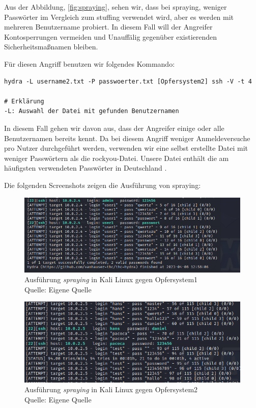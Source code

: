 Aus der Abbildung, \ref{fig:spraying}, sehen wir, dass bei \gls{spraying}, weniger Passwörter im Vergleich zum \gls{stuffing} verwendet wird, aber es werden mit mehreren Benutzername probiert. In diesem Fall will der Angreifer  Kontosperrungen vermeiden und Unauffälig gegenüber existierenden Sicherheitsmaßnamen bleiben.

Für diesen Angriff benutzen wir folgendes Kommando:
{
\begin{Verbatim}[frame=single]
hydra -L username2.txt -P passwoerter.txt [Opfersystem2] ssh -V -t 4

# Erklärung
-L: Auswahl der Datei mit gefunden Benutzernamen
\end{Verbatim}
}

\newpage
In diesem Fall gehen wir davon aus, dass der Angreifer einige oder alle Benutzernamen bereits kennt. Da bei diesem Angriff weniger Anmeldeversuche pro Nutzer durchgeführt werden, verwenden wir eine selbst erstellte Datei mit weniger Passwörtern als die \gls{rockyou}-Datei. Unsere Datei enthält die am häufigsten verwendeten Passwörter in Deutschland \citep{silicon_passwort}.

Die folgenden Screenshots zeigen die Ausführung von \gls{spraying}:
\begin{figure}[H]
   \centering
   \includegraphics[width=1\textwidth]{assets/Spraying_Kali.png}
   \caption[Ausführung \textit{\gls{spraying}} in Kali Linux gegen Opfersystem1]
   {Ausführung \textit{\gls{spraying}} in Kali Linux gegen Opfersystem1\\Quelle: Eigene Quelle}
   \centering
\end{figure}

\begin{figure}[H]
   \centering
   \includegraphics[width=1\textwidth]{assets/Spraying_Kali2.png}
   \caption[Ausführung \textit{\gls{spraying}} in Kali Linux gegen Opfersystem2]
   {Ausführung \textit{\gls{spraying}} in Kali Linux gegen Opfersystem2\\Quelle: Eigene Quelle}
   \centering
\end{figure}

